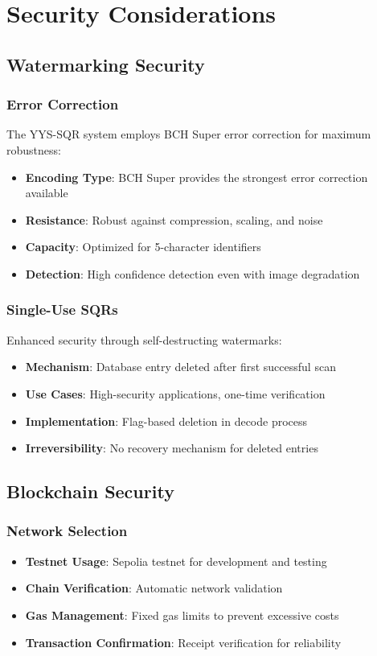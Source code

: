 \documentclass[12pt,a4paper]{article}
\begin{document}
\section{Security Considerations}

\subsection{Watermarking Security}

\subsubsection{Error Correction}
The YYS-SQR system employs BCH Super error correction for maximum robustness:
\begin{itemize}
    \item \textbf{Encoding Type}: BCH Super provides the strongest error correction available
    \item \textbf{Resistance}: Robust against compression, scaling, and noise
    \item \textbf{Capacity}: Optimized for 5-character identifiers
    \item \textbf{Detection}: High confidence detection even with image degradation
\end{itemize}

\subsubsection{Single-Use SQRs}
Enhanced security through self-destructing watermarks:
\begin{itemize}
    \item \textbf{Mechanism}: Database entry deleted after first successful scan
    \item \textbf{Use Cases}: High-security applications, one-time verification
    \item \textbf{Implementation}: Flag-based deletion in decode process
    \item \textbf{Irreversibility}: No recovery mechanism for deleted entries
\end{itemize}

\subsection{Blockchain Security}

\subsubsection{Network Selection}
\begin{itemize}
    \item \textbf{Testnet Usage}: Sepolia testnet for development and testing
    \item \textbf{Chain Verification}: Automatic network validation
    \item \textbf{Gas Management}: Fixed gas limits to prevent excessive costs
    \item \textbf{Transaction Confirmation}: Receipt verification for reliability
\end{itemize}
\end{document}
